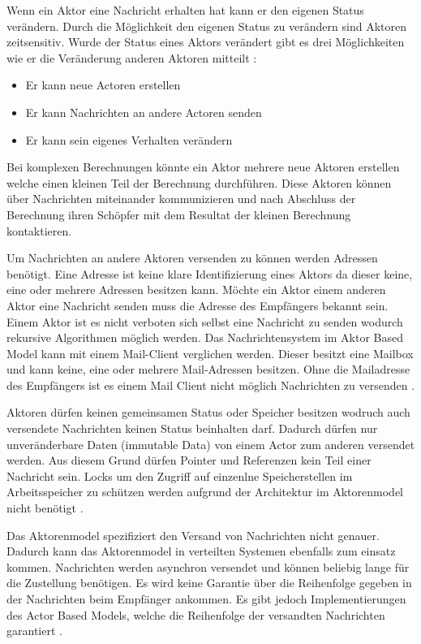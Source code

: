 Wenn ein Aktor eine Nachricht erhalten hat kann er den eigenen Status verändern. Durch die Möglichkeit den eigenen Status zu verändern sind Aktoren zeitsensitiv. Wurde der Status eines Aktors verändert gibt es drei Möglichkeiten wie er die Veränderung anderen Aktoren mitteilt \cite[p. 84]{Erb2012}:

\begin{itemize}
  \item Er kann neue Actoren erstellen
  \item Er kann Nachrichten an andere Actoren senden
  \item Er kann sein eigenes Verhalten verändern
\end{itemize}

Bei komplexen Berechnungen könnte ein Aktor mehrere neue Aktoren erstellen welche einen kleinen Teil der Berechnung durchführen. Diese Aktoren können über Nachrichten miteinander kommunizieren und nach Abschluss der Berechnung ihren Schöpfer mit dem Resultat der kleinen Berechnung kontaktieren. 

Um Nachrichten an andere Aktoren versenden zu können werden Adressen benötigt. Eine Adresse ist keine klare Identifizierung eines Aktors da dieser keine, eine oder mehrere Adressen besitzen kann. Möchte ein Aktor einem anderen Aktor eine Nachricht senden muss die Adresse des Empfängers bekannt sein. Einem Aktor ist es nicht verboten sich selbst eine Nachricht zu senden wodurch rekursive Algorithmen möglich werden. Das Nachrichtensystem im Aktor Based Model kann mit einem Mail-Client verglichen werden. Dieser besitzt eine Mailbox und kann keine, eine oder mehrere Mail-Adressen besitzen. Ohne die Mailadresse des Empfängers ist es einem Mail Client nicht möglich Nachrichten zu versenden \cite[p. 85]{Erb2012}. 

Aktoren dürfen keinen gemeinsamen Status oder Speicher besitzen wodruch auch versendete Nachrichten keinen Status beinhalten darf. Dadurch dürfen nur unveränderbare Daten (immutable Data) von einem Actor zum anderen versendet werden. Aus diesem Grund dürfen Pointer und Referenzen kein Teil einer Nachricht sein. Locks um den Zugriff auf einzenlne Speicherstellen im Arbeitsspeicher zu schützen werden aufgrund der Architektur im Aktorenmodel  nicht benötigt \cite[p. 85]{Erb2012}.

Das Aktorenmodel spezifiziert den Versand von Nachrichten nicht genauer. Dadurch kann das Aktorenmodel in verteilten Systemen ebenfalls zum einsatz kommen. Nachrichten werden asynchron versendet und können beliebig lange für die Zustellung benötigen. Es wird keine Garantie über die Reihenfolge gegeben in der Nachrichten beim Empfänger ankommen. Es gibt jedoch Implementierungen des Actor Based Models, welche die Reihenfolge der versandten Nachrichten garantiert \cite[p. 85]{Erb2012}.

